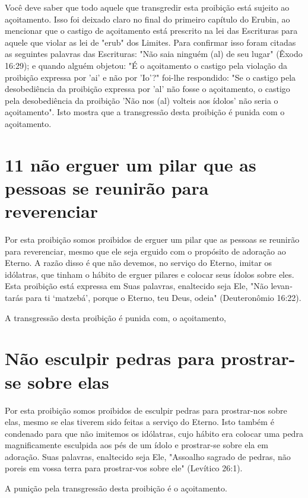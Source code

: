 \begin{itemize}
\begin{enumrate}
\begin{itemize}
\begin{itemize}
\begin{itemize}
Você deve saber que todo aquele que transgredir esta proibição está
sujeito ao açoitamento. Isso foi deixado claro no final do primeiro
capítulo do Erubin, ao mencionar que o castigo de açoitamento está
prescrito na lei das Escrituras para aquele que violar as lei de "erub"
dos Limites. Para confirmar isso foram citadas as seguintes palavras das
Escrituras: "Não saia ninguém (al) de seu lugar" (Êxodo 16:29); e quando
alguém objetou: "É o açoitamento o castigo pela violação da proibição
expressa por 'ai' e não por 'Io'?" foi-lhe res­pondido: "Se o castigo
pela desobediência da proibição expressa por 'al' não fosse o
açoitamento, o castigo pela desobediência da proibição 'Não nos (al)
volteis aos ídolos' não seria o açoitamento". Isto mostra que a
transgressão desta proibição é punida com o açoitamento.

\section{11 não erguer um pilar que as pessoas se reunirão para reverenciar}

Por esta proibição somos proibidos de erguer um pilar que as pessoas se
reunirão para reverenciar, mesmo que ele seja erguido com o propósito de
ado­ração ao Eterno. A razão disso é que não devemos, no serviço do
Eterno, imitar os idólatras, que tinham o hábito de erguer pilares e
colocar seus ídolos sobre eles. Esta proibição está expressa em Suas
palavras, enaltecido seja Ele, "Não levan­tarás para ti `matzebá',
porque o Eterno, teu Deus, odeia" (Deuteronômio 16:22).

A transgressão desta proibição é punida com, o açoitamento,

\section{Não esculpir pedras para prostrar-se sobre elas}

Por esta proibição somos proibidos de esculpir pedras para prostrar-nos
sobre elas, mesmo se elas tiverem sido feitas a serviço do Eterno. Isto
tam­bém é condenado para que não imitemos os idólatras, cujo hábito era
colocar
uma pedra magnificamente esculpida aos pés de um ídolo e prostrar-se
sobre ela em adoração. Suas palavras, enaltecido seja Ele, "Assoalho
sagrado de pe­dras, não poreis em vossa terra para prostrar-vos sobre
ele" (Levítico 26:1).

A punição pela transgressão desta proibição é o açoitamento.


\end{itemize}
\end{itemize}
\end{itemize}
\end{enumrate}
\end{itemize}
